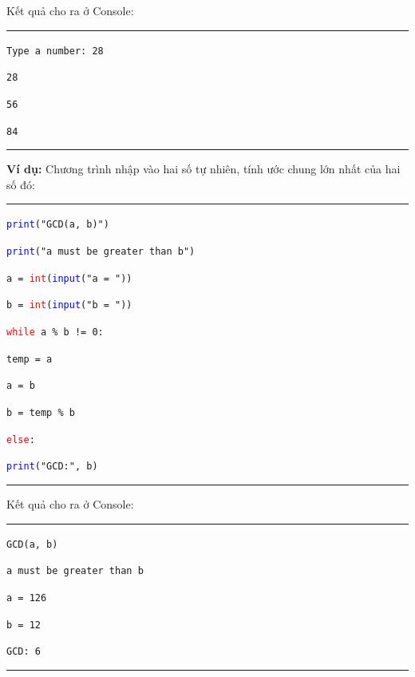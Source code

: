 \noindent
\resetlinenumber
Kết quả cho ra ở Console:\\
\rule{\linewidth}{0.2mm}\par
\begin{linenumbers}
	\texttt{Type a number: 28}\par
	\texttt{28}\par
	\texttt{56}\par
	\texttt{84}\par
\end{linenumbers}
\rule{\linewidth}{0.2mm}\par
\resetlinenumber
\newpage
\textbf{Ví dụ:} Chương trình nhập vào hai số tự nhiên, tính ước chung lớn nhất của hai số đó:\\
\rule{\linewidth}{0.2mm}\par
\begin{linenumbers}
	\texttt{\textcolor{blue}{print}("GCD(a, b)")}\par
	\texttt{\textcolor{blue}{print}("a must be greater than b")}\par
	\texttt{a = \textcolor{red}{int}(\textcolor{blue}{input}("a = "))}\par
	\texttt{b = \textcolor{red}{int}(\textcolor{blue}{input}("b = "))}\par
	\texttt{\textcolor{red}{while} a \% b != 0:}\par
	\qquad \texttt{temp = a}\par
	\qquad \texttt{a = b}\par
	\qquad \texttt{b = temp \% b}\par
	\texttt{\textcolor{red}{else}:}\par
	\qquad\texttt{\textcolor{blue}{print}("GCD:", b)}\par
\end{linenumbers}
\rule{\linewidth}{0.2mm}\par
\noindent
\resetlinenumber
Kết quả cho ra ở Console:\\
\rule{\linewidth}{0.2mm}\par
\begin{linenumbers}
	\texttt{GCD(a, b)}\par
	\texttt{a must be greater than b}\par
	\texttt{a = 126}\par
	\texttt{b = 12}\par
	\texttt{GCD: 6}\par
\end{linenumbers}
\rule{\linewidth}{0.2mm}\par
\resetlinenumber
